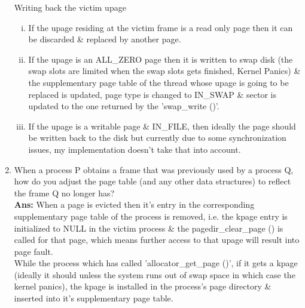 \documentclass[a4,11pt]{article}
\begin{document}
\begin{enumerate}
Writing back the victim upage
\begin{enumerate}[(i)]
\item If the upage residing at the victim frame is a read only page then it can be discarded \& replaced by another page.
\item If the upage is an ALL\_ZERO page then it is written to swap disk (the swap slots are limited when the swap slots gets finished, Kernel Panics) \& the supplementary page table of the thread whose upage is going to be replaced is updated, page type is changed to IN\_SWAP \& sector is updated to the one returned by the 'swap\_write ()'.
\item If the upage is a writable page \& IN\_FILE, then ideally the page should be written back to the disk but currently due to some synchronization issues, my implementation doesn't take that into account.
\end{enumerate}


\item When a process P obtains a frame that was previously used by a  process Q, how do you adjust the page table (and any other data structures) to reflect the frame Q no longer has? \\
\textbf{Ans:} When a page is evicted then it's entry in the corresponding supplementary page table of the process is removed, i.e. the kpage entry is initialized to NULL in the victim process \& the pagedir\_clear\_page () is called for that page, which means further access to that upage will result into page fault. \\
While the process which has called 'allocator\_get\_page ()', if it gets a kpage (ideally it should unless the system runs out of swap space in which case the kernel panics), the kpage is installed in the process's page directory \& inserted into it's supplementary page table.


\end{enumerate}
\end{document}
